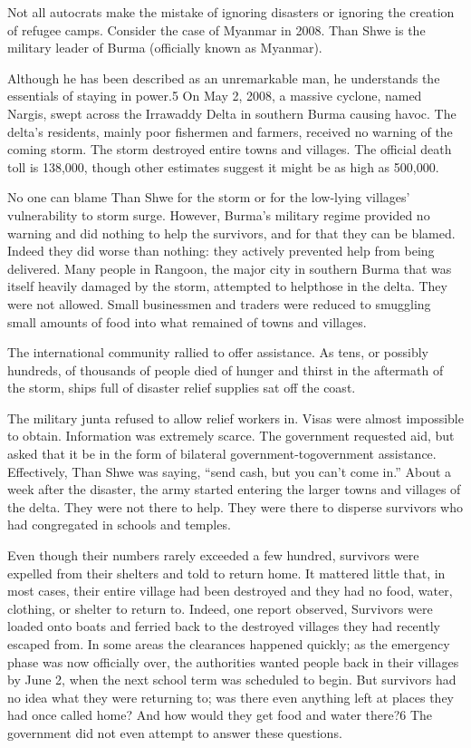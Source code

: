 \documentclass[10pt]{article}
\begin{document}
{\large Not all autocrats make the mistake of ignoring disasters or ignoring the
creation of refugee camps. Consider the case of Myanmar in 2008. Than Shwe is the
military leader of Burma (officially known as Myanmar).}

{\large Although he has been described as an unremarkable man, he understands
the essentials of staying in power.5 On May 2, 2008, a massive cyclone, named
Nargis, swept across the Irrawaddy Delta in southern Burma causing havoc. The
delta's residents, mainly poor fishermen and farmers, received no warning of the
coming storm. The storm destroyed entire towns and villages. The official death
toll is 138,000, though other estimates suggest it might be as high as 500,000.}

{\large No one can blame Than Shwe for the storm or for the low-lying villages'
vulnerability to storm surge. However, Burma's military regime provided no
warning and did nothing to help the survivors, and for that they can be blamed.
Indeed they did worse than nothing: they actively prevented help from being
delivered. Many people in Rangoon, the major city in southern Burma that was
itself heavily damaged by the storm, attempted to helpthose in the delta. They
were not allowed. Small businessmen and traders were reduced to smuggling small
amounts of food into what remained of towns and villages.}

{\large The international community rallied to offer assistance. As tens, or
possibly hundreds, of thousands of people died of hunger and thirst in the
aftermath of the storm, ships full of disaster relief supplies sat off the
coast.}

{\large The military junta refused to allow relief workers in. Visas were almost
impossible to obtain. Information was extremely scarce. The government requested
aid, but asked that it be in the form of bilateral government-togovernment
assistance. Effectively, Than Shwe was saying, ``send cash, but you can't come
in.'' About a week after the disaster, the army started entering the larger towns
and villages of the delta. They were not there to help. They were there to
disperse survivors who had congregated in schools and temples.}

{\large Even though their numbers rarely exceeded a few hundred, survivors were
expelled from their shelters and told to return home. It mattered little that, in
most cases, their entire village had been destroyed and they had no food, water,
clothing, or shelter to return to. Indeed, one report observed, Survivors were
loaded onto boats and ferried back to the destroyed villages they had recently
escaped from. In some areas the clearances happened quickly; as the emergency
phase was now officially over, the authorities wanted people back in their
villages by June 2, when the next school term was scheduled to begin. But
survivors had no idea what they were returning to; was there even anything left
at places they had once called home? And how would they get food and water
there?6 The government did not even attempt to answer these questions.}
\end{document}
